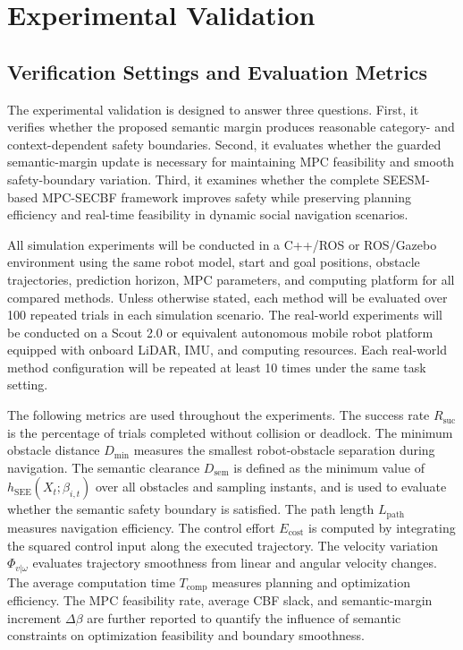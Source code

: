 \documentclass[journal]{IEEEtranTIE}
\begin{document}
    \section{Experimental Validation}
    \label{sec:Experiments}

    \subsection{Verification Settings and Evaluation Metrics}
    \label{sec:Verification_Settings}
    The experimental validation is designed to answer three questions. First, it
    verifies whether the proposed semantic margin produces reasonable
    category- and context-dependent safety boundaries. Second, it evaluates
    whether the guarded semantic-margin update is necessary for maintaining MPC
    feasibility and smooth safety-boundary variation. Third, it examines whether
    the complete SEESM-based MPC-SECBF framework improves safety while preserving
    planning efficiency and real-time feasibility in dynamic social navigation
    scenarios.

    All simulation experiments will be conducted in a C++/ROS or ROS/Gazebo
    environment using the same robot model, start and goal positions, obstacle
    trajectories, prediction horizon, MPC parameters, and computing platform for
    all compared methods. Unless otherwise stated, each method will be evaluated
    over 100 repeated trials in each simulation scenario. The real-world
    experiments will be conducted on a Scout 2.0 or equivalent autonomous mobile
    robot platform equipped with onboard LiDAR, IMU, and computing resources.
    Each real-world method configuration will be repeated at least 10 times
    under the same task setting.

    The following metrics are used throughout the experiments. The success rate
    $R_{\mathrm{suc}}$ is the percentage of trials completed without collision
    or deadlock. The minimum obstacle distance $D_{\min}$ measures the smallest
    robot-obstacle separation during navigation. The semantic clearance
    $D_{\mathrm{sem}}$ is defined as the minimum value of
    $h_{\mathrm{SEE}}(X_t;\beta_{i,t})$ over all obstacles and sampling instants,
    and is used to evaluate whether the semantic safety boundary is satisfied.
    The path length $L_{\mathrm{path}}$ measures navigation efficiency. The
    control effort $E_{\mathrm{cost}}$ is computed by integrating the squared
    control input along the executed trajectory. The velocity variation
    $\Phi_{v|\omega}$ evaluates trajectory smoothness from linear and angular
    velocity changes. The average computation time $T_{\mathrm{comp}}$ measures
    planning and optimization efficiency. The MPC feasibility rate, average CBF
    slack, and semantic-margin increment $\Delta\beta$ are further reported to
    quantify the influence of semantic constraints on optimization feasibility
    and boundary smoothness.
\end{document}
